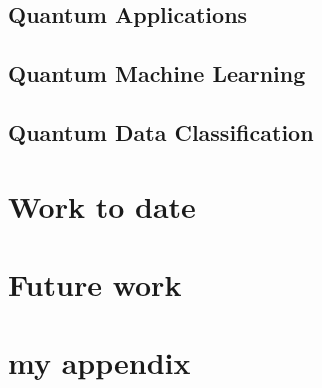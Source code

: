 \documentclass[english,a4paper,11pt,oneside,onecolumn]{book}
\begin{document}
\section{Quantum Applications}
\label{sec:qApps}

\section{Quantum Machine Learning}
\label{sec:qml}

\section{Quantum Data Classification}
\label{sec:qmlDataClass}

\chapter{Work to date}
\label{sec:wtd}


\chapter{Future work}
\label{sec:fw}


\nocite{}



\appendix
\chapter{my appendix}
\end{document}
